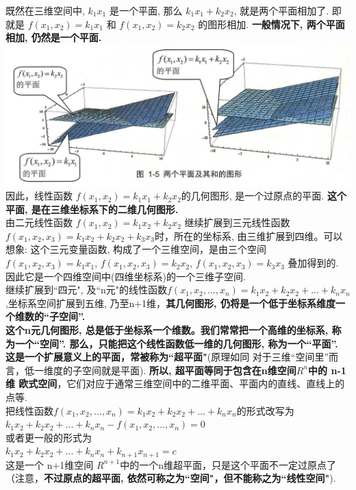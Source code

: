 \documentclass[UTF8]{ctexart}
\begin{document}
既然在三维空间中, $k_1 x_1$ 是一个平面, 那么 $k_1 x_1 +  k_2 x_2$, 就是两个平面相加了. 即就是 $f\left( x_1,x_2 \right) =k_1x_1$ 和 $f\left( x_1,x_2 \right) =k_2 x_2$ 的图形相加. \textbf{一般情况下, 两个平面相加, 仍然是一个平面.} \\

\includegraphics[width=1\textwidth]{img/0115.png}\\

因此，线性函数 $f(x_1, x_2) = k_1 x_1 + k_2 x_2$的几何图形, 是一个过原点的平面. \textbf{这个平面, 是在三维坐标系下的二维几何图形.}\\

由二元线性函数 $
f\left( x_1,x_2 \right) =k_1x_2+k_2x_2
$ 继续扩展到三元线性函数$
f\left( x_1,x_2,x_3 \right) =k_1x_2+k_2x_2+k_3x_3
$时，所在的坐标系, 由三维扩展到四维。可以想象: 这个三元变量函数, 构成了一个三维空间，是由三个空间
$f\left( x_1,x_2,x_3 \right) =k_1x_1$, 
$f\left( x_1,x_2,x_3 \right) =k_2x_2$,
$f\left( x_1,x_2,x_3 \right) =k_3x_3$ 叠加得到的. 因此它是一个四维空间中(四维坐标系)的一个三维子空间. \\

继续扩展到``四元", 及``n元"的线性函数$
f\left( x_1,x_2,...,x_n \right) =k_1x_2+k_2x_2+...+k_nx_n
$,坐标系空间扩展到五维, 乃至n+1维，\textbf{其几何图形, 仍将是一个低于坐标系维度一个维数的``子空间''.} \\

\textbf{这个n元几何图形, 总是低于坐标系一个维数。我们常常把一个高维的坐标系, 称为一个``空间''. 那么，只能把这个线性函数低一维的几何图形, 称为一个``平面''. 这是一个扩展意义上的平面，常被称为``超平面"}(原理如同 对于三维``空间里''而言，低一维度的子空间就是平面). \textbf{所以, 超平面等同于包含在n维空间$R^n$中的 n-1维 欧式空间}，它们对应于通常三维空间中的二维平面、平面内的直线、直线上的点等. \\


把线性函数$
f\left( x_1,x_2,...,x_n \right) =k_1x_2+k_2x_2+...+k_nx_n
$的形式改写为 \\
$
k_1x_2+k_2x_2+...+k_nx_n-f\left( x_1,x_2,...,x_n \right) =0
$\\
或者更一般的形式为\\
$
k_1x_2+k_2x_2+...+k_nx_n+k_{n+1}x_{n+1}=c
$\\
这是一个 n+1维空间 $R^{n+1}$中的一个n维超平面，只是这个平面不一定过原点了（注意，\textbf{不过原点的超平面, 依然可称之为``空间"，但不能称之为``线性空间"}). \\
\end{document}
